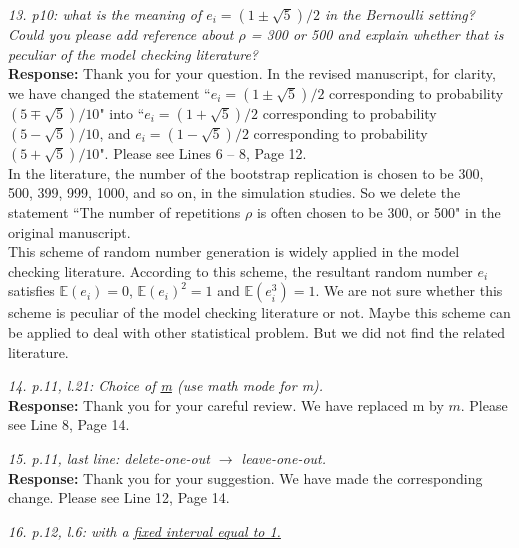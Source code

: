 \documentclass[12pt]{report}
\begin{document}
\begin{description}
\item {{ \textcolor[rgb]{0.00,0.50,1.00}{\em 13.  p10: what is the meaning of  $e_i=(1\pm \sqrt{5})/2$ in the Bernoulli setting? Could you please add
reference about $\rho$ = 300 or 500 and explain whether that is peculiar of the model checking literature?}}}\\

{ \bf Response: } Thank you for your question.  In the revised manuscript, for clarity, we have changed the statement ``$e_i=(1\pm\sqrt{5})/2$  corresponding to probability $(5\mp\sqrt{5})/10$" into
``$e_i=(1+\sqrt{5})/2$  corresponding to probability $(5-\sqrt{5})/10$, and $e_i=(1-\sqrt{5})/2$  corresponding to probability $(5+\sqrt{5})/10$". Please see Lines 6 -- 8, Page 12.\\

In the literature, the number of the bootstrap replication is chosen to be 300, 500, 399, 999, 1000, and so on, in the simulation studies. So we delete the statement ``The number of repetitions $\rho$ is often chosen to be 300, or 500" in the original manuscript. \\

This scheme of random number generation is  widely applied in the model checking literature. According to this scheme, the resultant random number $e_i$ satisfies $\mathbb{E}(e_i)=0$,  $\mathbb{E}(e_i)^2=1$ and $\mathbb{E}(e_i^3)=1$. We  are not sure whether this scheme is peculiar of the model checking literature or not. Maybe this scheme can be applied to deal with other statistical problem. But we did not find the related literature.\\



\item {{ \textcolor[rgb]{0.00,0.50,1.00}{\em 14.  p.11, l.21: Choice of \uline{m} (use math mode for m).}}}\\

{ \bf Response: } Thank you for your careful review. We have replaced m by $m$. Please see Line 8, Page 14.

\item {{ \textcolor[rgb]{0.00,0.50,1.00}{\em 15.  p.11, last line: delete-one-out $\rightarrow$ leave-one-out.}}}\\

{ \bf Response: } Thank you for your suggestion.  We have made the corresponding change. Please see Line 12, Page 14.

\item {{ \textcolor[rgb]{0.00,0.50,1.00}{\em 16.  p.12, l.6: with a \uline{fixed interval equal to 1.}
}}}\\


\end{description}
\end{document}
